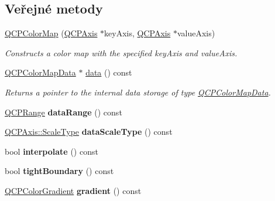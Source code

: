 \subsection*{Veřejné metody}
\begin{DoxyCompactItemize}
\item 
\hyperlink{classQCPColorMap_aa37e976d2ee1e2be6c4cd88a64b36215}{Q\+C\+P\+Color\+Map} (\hyperlink{classQCPAxis}{Q\+C\+P\+Axis} $\ast$key\+Axis, \hyperlink{classQCPAxis}{Q\+C\+P\+Axis} $\ast$value\+Axis)
\begin{DoxyCompactList}\small\item\em Constructs a color map with the specified {\itshape key\+Axis} and {\itshape value\+Axis}. \end{DoxyCompactList}\item 
\hyperlink{classQCPColorMapData}{Q\+C\+P\+Color\+Map\+Data} $\ast$ \hyperlink{classQCPColorMap_a3ae12c9ce842352037cd20ea5267414f}{data} () const 
\begin{DoxyCompactList}\small\item\em Returns a pointer to the internal data storage of type \hyperlink{classQCPColorMapData}{Q\+C\+P\+Color\+Map\+Data}. \end{DoxyCompactList}\item 
\hypertarget{classQCPColorMap_a37cc8e821e070697e15652f6419fab48}{}\hyperlink{classQCPRange}{Q\+C\+P\+Range} {\bfseries data\+Range} () const \label{classQCPColorMap_a37cc8e821e070697e15652f6419fab48}

\item 
\hypertarget{classQCPColorMap_a5ffc703dc603c4fd942f36ea51b8c48d}{}\hyperlink{classQCPAxis_a36d8e8658dbaa179bf2aeb973db2d6f0}{Q\+C\+P\+Axis\+::\+Scale\+Type} {\bfseries data\+Scale\+Type} () const \label{classQCPColorMap_a5ffc703dc603c4fd942f36ea51b8c48d}

\item 
\hypertarget{classQCPColorMap_a39019675a7ad00efad7212b96c0ccc95}{}bool {\bfseries interpolate} () const \label{classQCPColorMap_a39019675a7ad00efad7212b96c0ccc95}

\item 
\hypertarget{classQCPColorMap_aa1d9aa8db73a5942881f6f6c5afdbb0f}{}bool {\bfseries tight\+Boundary} () const \label{classQCPColorMap_aa1d9aa8db73a5942881f6f6c5afdbb0f}

\item 
\hypertarget{classQCPColorMap_a9f967a971474e32345290b79cf107809}{}\hyperlink{classQCPColorGradient}{Q\+C\+P\+Color\+Gradient} {\bfseries gradient} () const \label{classQCPColorMap_a9f967a971474e32345290b79cf107809}


\end{DoxyCompactItemize}
